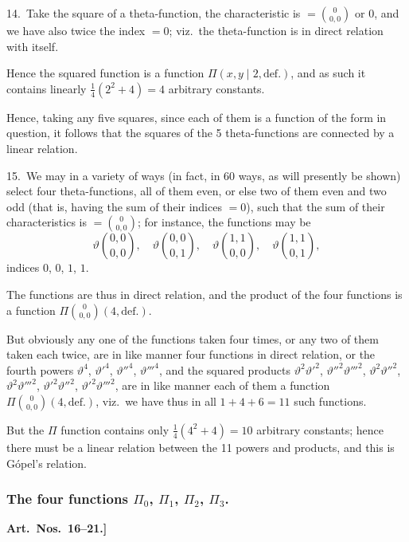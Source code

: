 \documentclass[11pt,a4paper]{book}
\begin{document}
\medskip

14.\ Take the square of a theta-function, the characteristic is $= \binom{0}{0, 0}$ or $0$, and we have also twice the index $= 0$; viz.\ the theta-function is in direct relation with itself.

Hence the squared function is a function $\Pi(x, y \mid 2, \text{def.})$, and as such it contains linearly $\frac{1}{4}(2^2 + 4) = 4$ arbitrary constants.

Hence, taking any five squares, since each of them is a function of the form in question, it follows that the squares of the 5 theta-functions are connected by a linear relation.

\medskip

15.\ We may in a variety of ways (in fact, in 60 ways, as will presently be shown) select four theta-functions, all of them even, or else two of them even and two odd (that is, having the sum of their indices $= 0$), such that the sum of their characteristics is $= \binom{0}{0, 0}$; for instance, the functions may be
\[
\vartheta\binom{0,0}{0,0}, \quad \vartheta\binom{0,0}{0,1}, \quad \vartheta\binom{1,1}{0,0}, \quad \vartheta\binom{1,1}{0,1},
\]
indices $0$, $0$, $1$, $1$.

The functions are thus in direct relation, and the product of the four functions is a function $\Pi\binom{0}{0, 0}(4, \text{def.})$.

But obviously any one of the functions taken four times, or any two of them taken each twice, are in like manner four functions in direct relation, or the fourth powers $\vartheta^4$, $\vartheta'^4$, $\vartheta''^4$, $\vartheta'''^4$, and the squared products $\vartheta^2\vartheta'^2$, $\vartheta''^2\vartheta'''^2$, $\vartheta^2\vartheta''^2$, $\vartheta^2\vartheta'''^2$, $\vartheta'^2\vartheta''^2$, $\vartheta'^2\vartheta'''^2$, are in like manner each of them a function $\Pi\binom{0}{0, 0}(4, \text{def.})$, viz.\ we have thus in all $1 + 4 + 6 = 11$ such functions.

But the $\Pi$ function contains only $\frac{1}{4}(4^2 + 4) = 10$ arbitrary constants; hence there must be a linear relation between the 11 powers and products, and this is G\'{o}pel's relation.

\subsubsection*{The four functions $\Pi_0$, $\Pi_1$, $\Pi_2$, $\Pi_3$.}

\textbf{Art.~Nos.~16--21.]
}
\end{document}
